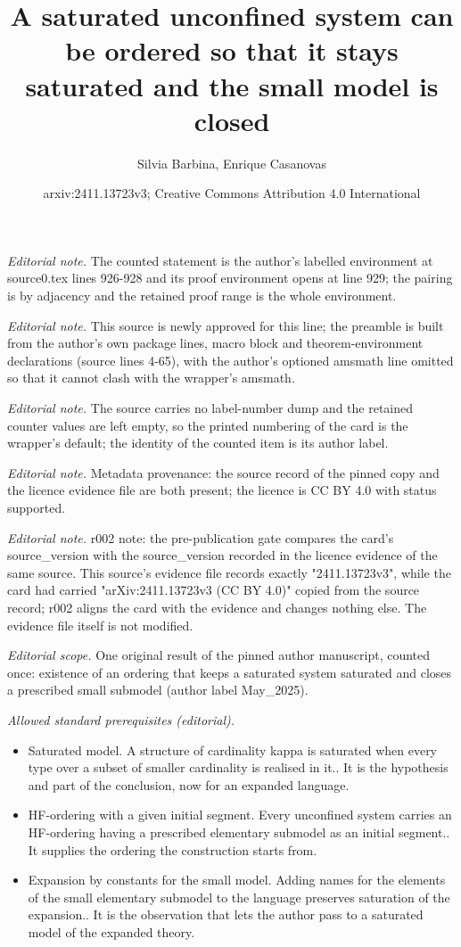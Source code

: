 \documentclass[10pt,a4paper]{article}
\title{A saturated unconfined system can be ordered so that it stays saturated and the small model is closed}
\author{Silvia Barbina, Enrique Casanovas}
\date{arxiv:2411.13723v3; Creative Commons Attribution 4.0 International}
\theoremstyle{note}
\begin{document}
\maketitle
\noindent\textit{Editorial note.} The counted statement is the author's labelled environment at source0.tex lines 926-928 and its proof environment opens at line 929; the pairing is by adjacency and the retained proof range is the whole environment.\par\medskip
\noindent\textit{Editorial note.} This source is newly approved for this line; the preamble is built from the author's own package lines, macro block and theorem-environment declarations (source lines 4-65), with the author's optioned amsmath line omitted so that it cannot clash with the wrapper's amsmath.\par\medskip
\noindent\textit{Editorial note.} The source carries no label-number dump and the retained counter values are left empty, so the printed numbering of the card is the wrapper's default; the identity of the counted item is its author label.\par\medskip
\noindent\textit{Editorial note.} Metadata provenance: the source record of the pinned copy and the licence evidence file are both present; the licence is CC BY 4.0 with status supported.\par\medskip
\noindent\textit{Editorial note.} r002 note: the pre-publication gate compares the card's source\_version with the source\_version recorded in the licence evidence of the same source. This source's evidence file records exactly "2411.13723v3", while the card had carried "arXiv:2411.13723v3 (CC BY 4.0)" copied from the source record; r002 aligns the card with the evidence and changes nothing else. The evidence file itself is not modified.\par\medskip
\noindent\textit{Editorial scope.} One original result of the pinned author manuscript, counted once: existence of an ordering that keeps a saturated system saturated and closes a prescribed small submodel (author label May\_2025).\par\medskip
\noindent\textit{Allowed standard prerequisites (editorial).}\begin{itemize}
\item Saturated model. A structure of cardinality kappa is saturated when every type over a subset of smaller cardinality is realised in it.. It is the hypothesis and part of the conclusion, now for an expanded language.
\item HF-ordering with a given initial segment. Every unconfined system carries an HF-ordering having a prescribed elementary submodel as an initial segment.. It supplies the ordering the construction starts from.
\item Expansion by constants for the small model. Adding names for the elements of the small elementary submodel to the language preserves saturation of the expansion.. It is the observation that lets the author pass to a saturated model of the expanded theory.
\end{itemize}\medskip
\end{document}
